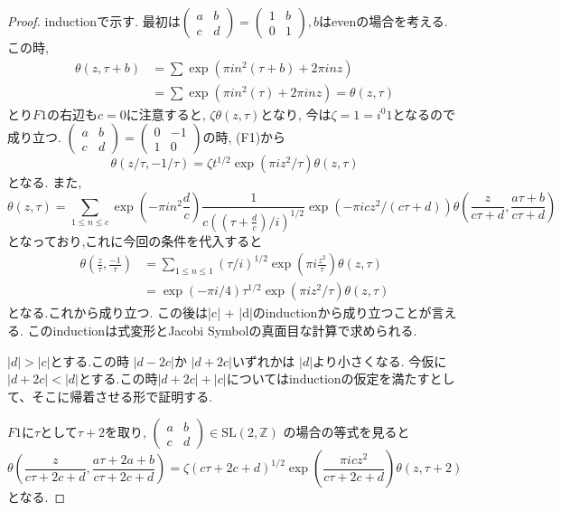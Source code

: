 \begin{proof}
inductionで示す.
最初は$
\begin{pmatrix}
a & b \\ c & d
\end{pmatrix}
= \begin{pmatrix}
1 & b \\ 0 & 1
\end{pmatrix}
,b$はevenの場合を考える.
この時,
\begin{align*}
\theta(z, \tau + b)
& = \sum \exp(\pi i n^2 (\tau + b) + 2\pi inz) \\
& = \sum \exp(\pi i n^2 (\tau ) + 2\pi inz)  = \theta(z, \tau)
\end{align*}
とり$F1$の右辺も$c =0$に注意すると,
$\zeta  \theta(z, \tau)$となり,
今は$\zeta =1 = i^0 1$となるので成り立つ.
$\begin{pmatrix}
a & b \\ c & d
\end{pmatrix}
= \begin{pmatrix}
0 & -1 \\ 1 & 0
\end{pmatrix}
$の時,
(F1)から
\begin{equation*}
    \theta(z/\tau, -1/\tau) = \zeta t^{1/2} \exp(\pi i z^2/\tau) \theta(z, \tau)
\end{equation*}
となる.
また,
\begin{equation*}
 \theta(z, \tau)  = \sum_{1\le n \le c}\exp(-\pi in^2 \frac{d}{c}) \frac{1}{ c ((\tau + \frac{d}{c})/i)^{1/2}} \exp(-\pi i c z^2/ (c \tau + d)) \theta(\frac{z}{c \tau + d}, \frac{a \tau + b}{ c\tau + d})
\end{equation*}
となっており,これに今回の条件を代入すると
\begin{align*}
\theta(\frac{z}{\tau}, \frac{-1}{\tau})  & = \sum_{1 \le n \le 1} (\tau / i)^{1/2} \exp(\pi i \frac{z^2}{\tau}) \theta(z , \tau) \\
& = \exp(- \pi i /4) \tau^{1/2} \exp(\pi i z^2 / \tau) \theta(z, \tau)
\end{align*}
となる.これから成り立つ.
この後は|c| + |d|のinductionから成り立つことが言える.
このinductionは式変形とJacobi Symbolの真面目な計算で求められる.

$|d| > |c|$とする.この時
$|d-2c|$か $|d + 2c|$いずれかは $|d|$より小さくなる.
今仮に $|d + 2c| < |d|$とする.この時$|d+2c| + |c|$についてはinductionの仮定を満たすとして、そこに帰着させる形で証明する.

$F1$に$\tau$として$\tau + 2$を取り,
$
\begin{pmatrix}
a & b  \\ c  & d 
\end{pmatrix}
\in \mathrm{SL}(2, \mathbb{Z})
$
の場合の等式を見ると
\begin{equation*}
\theta(\frac{z}{c \tau + 2c + d}, \frac{a\tau + 2a + b}{c 
\tau  + 2c + d}) = \zeta (c \tau +2c + d)^{1/2}\exp(\frac{\pi i c z^2}{c \tau + 2c + d})\theta(z, \tau + 2)
\end{equation*}
となる.


\end{proof}
